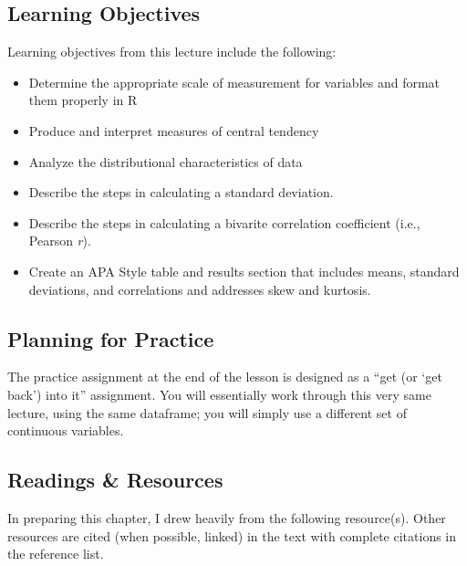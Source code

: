 \documentclass[
  11pt,
]{book}
\providecommand{\tightlist}{%
  \setlength{\itemsep}{0pt}\setlength{\parskip}{0pt}}
\begin{document}
\hypertarget{learning-objectives-1}{%
\subsection{Learning Objectives}\label{learning-objectives-1}}

Learning objectives from this lecture include the following:

\begin{itemize}
\tightlist
\item
  Determine the appropriate scale of measurement for variables and format them properly in R
\item
  Produce and interpret measures of central tendency
\item
  Analyze the distributional characteristics of data
\item
  Describe the steps in calculating a standard deviation.
\item
  Describe the steps in calculating a bivarite correlation coefficient (i.e., Pearson \emph{r}).
\item
  Create an APA Style table and results section that includes means, standard deviations, and correlations and addresses skew and kurtosis.
\end{itemize}

\hypertarget{planning-for-practice}{%
\subsection{Planning for Practice}\label{planning-for-practice}}

The practice assignment at the end of the lesson is designed as a ``get (or `get back') into it'' assignment. You will essentially work through this very same lecture, using the same dataframe; you will simply use a different set of continuous variables.

\hypertarget{readings-resources}{%
\subsection{Readings \& Resources}\label{readings-resources}}

In preparing this chapter, I drew heavily from the following resource(s). Other resources are cited (when possible, linked) in the text with complete citations in the reference list.
\end{document}
